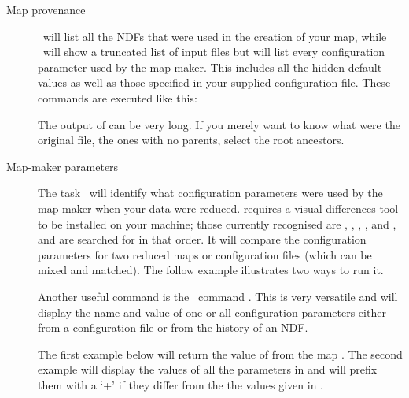 \begin{description}
\item[Map provenance]
  \provshow\ will list all the NDFs that were used in the creation of
  your map, while \hislist\ will show a truncated list of input files
  but will list every configuration parameter used by the map-maker.
  This includes all the hidden default values as well as those
  specified in your supplied configuration file. These commands are
  executed like this:
\begin{terminalv}
\end{terminalv}

The output of  can be very long.  If you merely want to
know what were the original file, the ones with no parents, select the
root ancestors.

\begin{terminalv}
\end{terminalv}


\item[Map-maker parameters]
The task \configmeld\ will identify what configuration parameters were
used by the map-maker when your data were reduced. 
requires a visual-differences tool to be installed on your machine;
those currently recognised are
,
,
,
, and
,
and are searched for in that order. It will compare the
configuration parameters for two reduced maps or configuration files
(which can be mixed and matched). The follow example illustrates two
ways to run it.

\begin{terminalv}
\end{terminalv}
Another useful command is the \Kappa\ command \configecho.
This is very versatile and will display the name and value of one or
all configuration parameters either from a configuration file or from
the history of an NDF.

The first example below will return the value of  from
the map . The second example will display the values of all
the parameters in  and will prefix them with a `+' if they
differ from the the values given in .

\begin{terminalv}
\end{terminalv}
\end{description}


